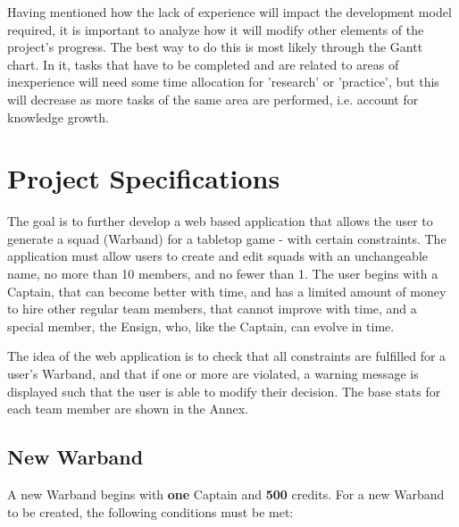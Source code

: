 \documentclass[12pt,a4paper]{article}
\begin{document}
Having mentioned how the lack of experience will impact the development model required, it is important to analyze how it will modify other elements of the project's progress. The best way to do this is most likely through the Gantt chart. In it, tasks that have to be completed and are related to areas of inexperience will need some time allocation for 'research' or 'practice', but this will decrease as more tasks of the same area are performed, i.e. account for knowledge growth. 

\section{Project Specifications}
\label{sec:concept}

The goal is to further develop a web based application that allows the user to generate a squad (Warband) for a tabletop game - with certain constraints. The application must allow users to create and edit squads with an unchangeable name, no more than 10 members, and no fewer than 1. The user begins with a Captain, that can become better with time, and has a limited amount of money to hire other regular team members, that cannot improve with time, and a special member, the Ensign, who, like the Captain, can evolve in time.

The idea of the web application is to check that all constraints are fulfilled for a user's Warband, and that if one or more are violated, a warning message is displayed such that the user is able to modify their decision. The base stats for each team member are shown in the Annex.

\subsection{New Warband}

A new Warband begins with \textbf{one} Captain and \textbf{500} credits. For a new Warband to be created, the following conditions must be met:
\end{document}
